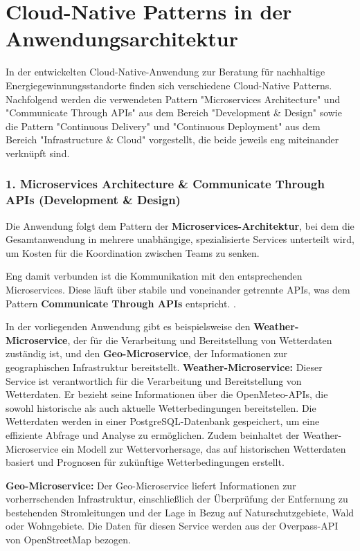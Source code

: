 \chapter{Cloud-Native Patterns in der Anwendungsarchitektur}

In der entwickelten Cloud-Native-Anwendung zur Beratung für nachhaltige Energiegewinnungsstandorte finden sich verschiedene Cloud-Native Patterns. Nachfolgend werden die verwendeten Pattern "Microservices Architecture" und "Communicate Through APIs" aus dem Bereich "Development \& Design" sowie die Pattern "Continuous Delivery" und "Continuous Deployment" aus dem Bereich "Infrastructure \& Cloud" vorgestellt, die beide jeweils eng miteinander verknüpft sind.

\subsection{1. Microservices Architecture \& Communicate Through APIs (Development \& Design)}

Die Anwendung folgt dem Pattern der \textbf{Microservices-Architektur}, bei dem die Gesamtanwendung in mehrere unabhängige, spezialisierte Services unterteilt wird, um Kosten für die Koordination zwischen Teams zu senken. \cite{MicroservicesArchitecture}

Eng damit verbunden ist die Kommunikation mit den entsprechenden Microservices. Diese läuft über stabile und voneinander getrennte APIs, was dem Pattern \textbf{Communicate Through APIs} entspricht. \cite{CommunicateThroughAPIs}.

In der vorliegenden Anwendung gibt es beispielsweise den \textbf{Weather-Microservice}, der für die Verarbeitung und Bereitstellung von Wetterdaten zuständig ist, und den \textbf{Geo-Microservice}, der Informationen zur geographischen Infrastruktur bereitstellt.
\textbf{Weather-Microservice:} Dieser Service ist verantwortlich für die Verarbeitung und Bereitstellung von Wetterdaten. Er bezieht seine Informationen über die OpenMeteo-APIs, die sowohl historische als auch aktuelle Wetterbedingungen bereitstellen. Die Wetterdaten werden in einer PostgreSQL-Datenbank gespeichert, um eine effiziente Abfrage und Analyse zu ermöglichen. Zudem beinhaltet der Weather-Microservice ein Modell zur Wettervorhersage, das auf historischen Wetterdaten basiert und Prognosen für zukünftige Wetterbedingungen erstellt.

\textbf{Geo-Microservice:} Der Geo-Microservice liefert Informationen zur vorherrschenden Infrastruktur, einschließlich der Überprüfung der Entfernung zu bestehenden Stromleitungen und der Lage in Bezug auf Naturschutzgebiete, Wald oder Wohngebiete. Die Daten für diesen Service werden aus der Overpass-API von OpenStreetMap bezogen.\\

